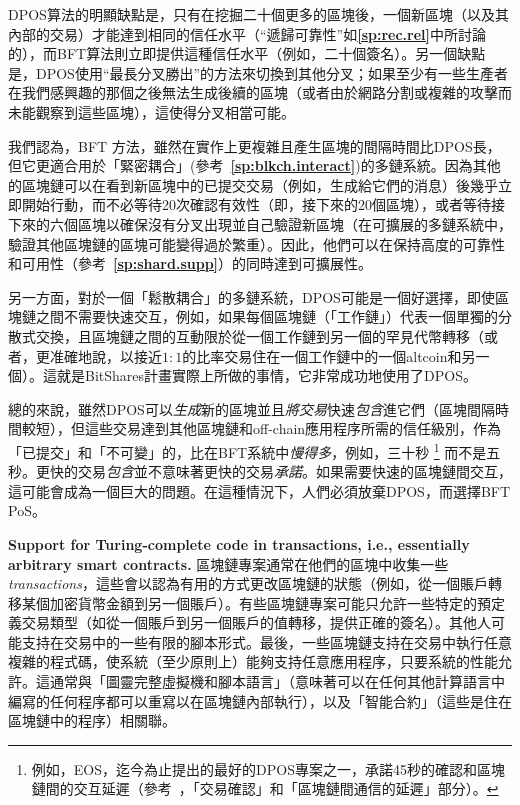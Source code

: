 \documentclass[12pt,oneside]{article}
\def\makepoint#1{\medbreak\noindent{\bf #1.\ }}
\def\nxsubpoint{\refstepcounter{subsubsection}%
  \smallbreak\makepoint{\thesubsubsection}}
\def\refpoint#1{{\rm\textbf{\ref{#1}}}}
\let\ptref=\refpoint
\def\embt(#1.){\textbf{#1.}}
\begin{document}
DPOS算法的明顯缺點是，只有在挖掘二十個更多的區塊後，一個新區塊（以及其內部的交易）才能達到相同的信任水平（“遞歸可靠性”如\ptref{sp:rec.rel}中所討論的），而BFT算法則立即提供這種信任水平（例如，二十個簽名）。另一個缺點是，DPOS使用“最長分叉勝出”的方法來切換到其他分叉；如果至少有一些生產者在我們感興趣的那個之後無法生成後續的區塊（或者由於網路分割或複雜的攻擊而未能觀察到這些區塊），這使得分叉相當可能。


我們認為，BFT 方法，雖然在實作上更複雜且產生區塊的間隔時間比DPOS長，但它更適合用於「緊密耦合」(參考~\ptref{sp:blkch.interact})的多鏈系統。因為其他的區塊鏈可以在看到新區塊中的已提交交易（例如，生成給它們的消息）後幾乎立即開始行動，而不必等待20次確認有效性（即，接下來的20個區塊），或者等待接下來的六個區塊以確保沒有分叉出現並自己驗證新區塊（在可擴展的多鏈系統中，驗證其他區塊鏈的區塊可能變得過於繁重）。因此，他們可以在保持高度的可靠性和可用性（參考~\ptref{sp:shard.supp}）的同時達到可擴展性。

另一方面，對於一個「鬆散耦合」的多鏈系統，DPOS可能是一個好選擇，即使區塊鏈之間不需要快速交互，例如，如果每個區塊鏈（「工作鏈」）代表一個單獨的分散式交換，且區塊鏈之間的互動限於從一個工作鏈到另一個的罕見代幣轉移（或者，更准確地說，以接近$1:1$的比率交易住在一個工作鏈中的一個altcoin和另一個）。這就是BitShares計畫實際上所做的事情，它非常成功地使用了DPOS。

總的來說，雖然DPOS可以\emph{生成}新的區塊並且\emph{將交易}快速\emph{包含}進它們（區塊間隔時間較短），但這些交易達到其他區塊鏈和off-chain應用程序所需的信任級別，作為「已提交」和「不可變」的，比在BFT系統中\emph{慢得多}，例如，三十秒%
\footnote{例如，EOS，迄今為止提出的最好的DPOS專案之一，承諾45秒的確認和區塊鏈間的交互延遲（參考~\cite{EOSWP}，「交易確認」和「區塊鏈間通信的延遲」部分）。}
而不是五秒。更快的交易\emph{包含}並不意味著更快的交易\emph{承諾}。如果需要快速的區塊鏈間交互，這可能會成為一個巨大的問題。在這種情況下，人們必須放棄DPOS，而選擇BFT PoS。


\nxsubpoint\label{sp:smartc.supp} \embt(Support for Turing-complete
code in transactions, i.e., essentially arbitrary smart contracts.)
區塊鏈專案通常在他們的區塊中收集一些{\em transactions\/}，這些會以認為有用的方式更改區塊鏈的狀態（例如，從一個賬戶轉移某個加密貨幣金額到另一個賬戶）。有些區塊鏈專案可能只允許一些特定的預定義交易類型（如從一個賬戶到另一個賬戶的值轉移，提供正確的簽名）。其他人可能支持在交易中的一些有限的腳本形式。最後，一些區塊鏈支持在交易中執行任意複雜的程式碼，使系統（至少原則上）能夠支持任意應用程序，只要系統的性能允許。這通常與「圖靈完整虛擬機和腳本語言」（意味著可以在任何其他計算語言中編寫的任何程序都可以重寫以在區塊鏈內部執行），以及「智能合約」（這些是住在區塊鏈中的程序）相關聯。
\end{document}
